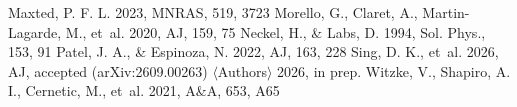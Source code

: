 \documentclass{aa}
\begin{document}
\begin{thebibliography}{}
 Maxted, P. F. L. 2023, MNRAS, 519, 3723
 Morello, G., Claret, A., Martin-Lagarde, M., et~al. 2020, AJ, 159, 75
 Neckel, H., \& Labs, D. 1994, Sol. Phys., 153, 91
 Patel, J. A., \& Espinoza, N. 2022, AJ, 163, 228
 Sing, D. K., et~al. 2026, AJ, accepted (arXiv:2609.00263) %
 $\langle$Authors$\rangle$ 2026, in prep.
 Witzke, V., Shapiro, A. I., Cernetic, M., et~al. 2021, A\&A, 653, A65
\end{thebibliography}
\end{document}
